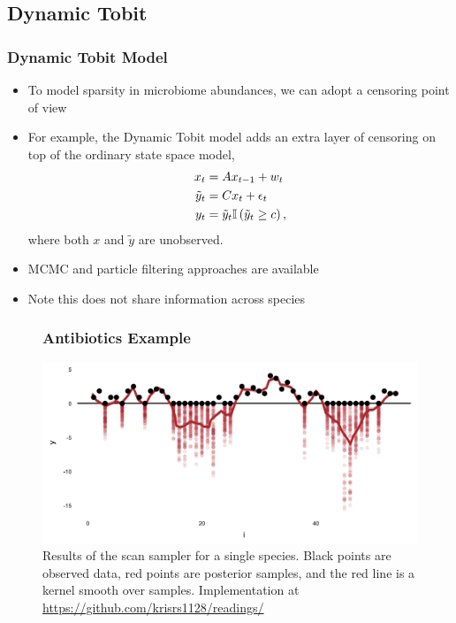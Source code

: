 \documentclass{beamer}
\begin{document}
\subsection{Dynamic Tobit}
\label{subsec:dynamic_tobit}

\begin{frame}
  \frametitle{Dynamic Tobit Model}
  \begin{itemize}
  \item To model sparsity in microbiome abundances, we can adopt a censoring
    point of view
  \item For example, the Dynamic Tobit model adds an extra layer of censoring on
    top of the ordinary state space model,
    \begin{align*}
      x_{t} &= Ax_{t - 1} + w_{t} \\
      \tilde{y}_{t} &= Cx_{t} + \epsilon_{t} \\
      y_{t} &= \tilde{y}_{t} \mathbb{I}\left({\tilde{y}_{t} \geq c}\right),
    \end{align*}
    where both $x$ and $\tilde{y}$ are unobserved.
  \item MCMC \citep{de1997scan, brockwell2006long, manrique1998simulation} and
    particle filtering \citep{andrieu2002particle} approaches are available
  \item Note this does not share information across species
  \end{itemize}
\end{frame}

\begin{figure}
  \frametitle{Antibiotics Example}
  \centering
  \includegraphics[width=\textwidth]{figure/abt_scan}
  \caption{Results of the scan sampler for a single species. Black points are
    observed data, red points are posterior samples, and the red line is a
    kernel smooth over samples. Implementation at
    \url{https://github.com/krisrs1128/readings/} \label{fig:abt_scan}
  }
\end{figure}
\end{document}
